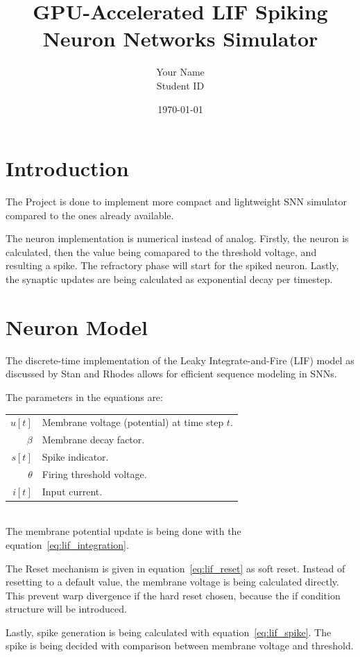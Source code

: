 \documentclass[11pt,a4paper]{article}
\title{GPU-Accelerated LIF Spiking Neuron Networks Simulator}
\author{Your Name \\ Student ID}
\date{\today}
\begin{document}
\maketitle

\section{Introduction}

The Project is done to implement more compact and lightweight 
SNN simulator compared to the ones already available. 

The neuron implementation is numerical instead of analog. 
Firstly, the neuron is calculated, 
then the value being comapared to the threshold voltage, and resulting a spike. 
The refractory phase will start for the spiked neuron.
Lastly, the synaptic updates are being calculated as exponential decay per timestep. 


\section{Neuron Model}
The discrete-time implementation of the Leaky Integrate-and-Fire (LIF) model 
as discussed by Stan and Rhodes \cite{stan2024learning} allows for 
efficient sequence modeling in SNNs.

The parameters in the equations are: \\

\begin{tabular}{r l}
  $u[t]$ & Membrane voltage (potential) at time step $t$. \\[0.5em]
  $\beta$ & Membrane decay factor. \\[0.5em]
  $s[t]$ & Spike indicator. \\[0.5em]
  $\theta$ & Firing threshold voltage. \\[0.5em]
  $i[t]$ & Input current.
\end{tabular}
\\

The membrane potential update is being done with the equation~\ref{eq:lif_integration}. 

The Reset mechanism is given in equation~\ref{eq:lif_reset} as soft reset. 
Instead of resetting to a default value, 
the membrane voltage is being calculated directly.
This prevent warp divergence if the hard reset chosen, 
because the if condition structure will be introduced.

Lastly, spike generation is being calculated with equation~\ref{eq:lif_spike}. 
The spike is being decided with comparison between membrane voltage and threshold.
\end{document}
